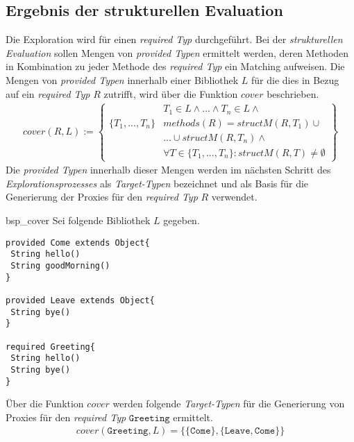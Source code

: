 \subsection{Ergebnis der strukturellen Evaluation}\label{sec_ergStructEval}
Die Exploration wird für einen \emph{required Typ} durchgeführt. Bei der \emph{strukturellen Evaluation} sollen Mengen von \emph{provided Typen} ermittelt werden, deren Methoden in Kombination zu jeder Methode des \emph{required Typ} ein Matching aufweisen. Die Mengen von \emph{provided Typen} innerhalb einer Bibliothek $L$ für die dies in Bezug auf ein \emph{required Typ} $R$ zutrifft, wird über die Funktion $cover$ beschrieben.
\begin{gather*}
cover(R,L) := 
\left\{\begin{array}{l|l}
					& T_1 \in L \wedge \text{...} \wedge T_n \in L 								\wedge \mathit{ }\\
\{T_1,...,T_n\}		& \mathit{methods(R)} = \mathit{structM(R,T_1)}							\cup \mathit{ }\\
					& \texttt{...} \cup \mathit{structM(R, T_n)} 								\wedge \mathit{ }\\
					& \forall T \in \{T_1,...,T_n\}:											\mathit{structM(R,T)} \neq \emptyset
\end{array}\right\}
\end{gather*}
Die \emph{provided Typen} innerhalb dieser Mengen werden im nächsten Schritt des \emph{Explorationsprozesses} als \emph{Target-Typen} bezeichnet und als Basis für die Generierung der Proxies für den \emph{required Typ} $R$ verwendet.
\newpage
\begin{example}{bsp_cover}
Sei folgende Bibliothek $L$ gegeben.
\begin{lstlisting}[style = dsl]
provided Come extends Object{
 String hello()
 String goodMorning()
}

provided Leave extends Object{
 String bye()
}

required Greeting{
 String hello()
 String bye()
}
\end{lstlisting}
Über die Funktion $\mathit{cover}$ werden folgende \emph{Target-Typen} für die Generierung von Proxies für den \emph{required Typ} $\texttt{Greeting}$ ermittelt.
\begin{gather*}
\mathit{cover(\texttt{Greeting},L)} = \{
	\{\texttt{Come}\},\{\texttt{Leave}, \texttt{Come}\}
\}
\end{gather*}
\end{example}
\newpage

